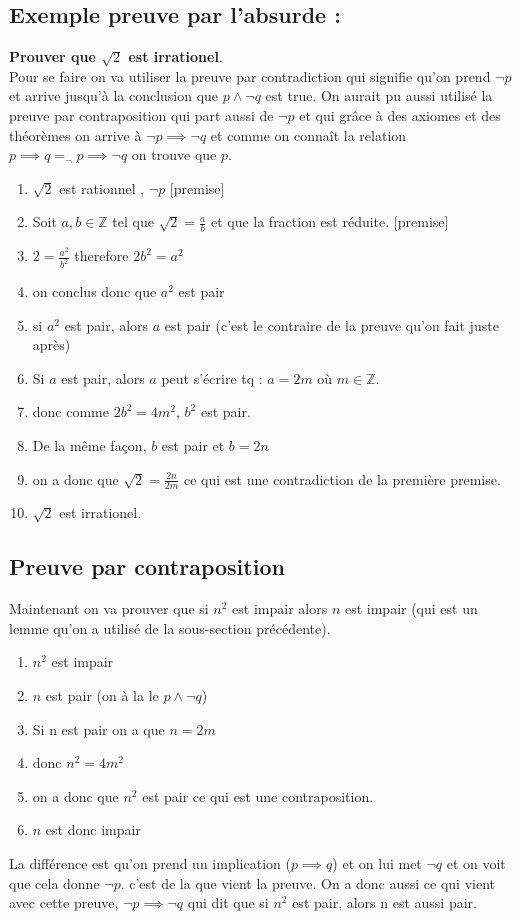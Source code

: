 \subsection{Exemple preuve par l'absurde :}

\textbf{Prouver que $\sqrt{2}$ est irrationel}.
\\
Pour se faire on va utiliser la preuve par contradiction qui signifie qu'on prend $\neg p$ et arrive jusqu'à la conclusion que $p \wedge \neg q$ est true. On aurait pu aussi utilisé la preuve par contraposition qui part aussi de $\neg p$ et qui grâce à des axiomes et des théorèmes on arrive à $\neg p \implies \neg q$ et comme on connaît la relation $p \implies q =_ \neg p \implies \neg q$ on trouve que $p$.
\\
\begin{enumerate}
    \item $\sqrt{2}$ est rationnel , $\neg p$ [premise]
    \item Soit $a, b \in \mathbb{Z}$ tel que $\sqrt{2} = \frac{a}{b}$ et que la fraction est réduite. [premise]
    \item $2 = \frac{a^2}{b^2}$ therefore $2b^2 = a^2$
    \item on conclus donc que $a^2$ est pair
    \item si $a^2$ est pair, alors $a$ est pair (c'est le contraire de la preuve qu'on fait juste après)
    \item Si $a$ est pair, alors $a$ peut s'écrire tq : $a = 2m$ où $m \in \mathbb{Z}$.
    \item donc comme $2b^2 = 4m^2$, $b^2$ est pair.
    \item De la même façon, $b$ est pair et $b = 2n$
    \item on a donc que $\sqrt{2} = \frac{2n}{2m}$ ce qui est une contradiction de la première premise.
    \item $\sqrt{2}$ est irrationel.

\end{enumerate}

\subsection{Preuve par contraposition}
Maintenant on va prouver que si $n^2$ est impair alors $n$ est impair (qui est un lemme qu'on a utilisé de la sous-section précédente).
\begin{enumerate}
    \item $n^2$ est impair
    \item $n$ est pair (on à la le $p \wedge \neg q$)
    \item Si n est pair on a que $n = 2m$
    \item donc $n^2 = 4m^2$
    \item on a donc que $n^2$ est pair ce qui est une contraposition.
    \item $n$ est donc impair
\end{enumerate}
La différence est qu'on prend un implication ($p \implies q$) et on lui met $\neg q$ et on voit que cela donne $\neg p$. c'est de la que vient la preuve. On a donc aussi ce qui vient avec cette preuve, $\neg p \implies \neg q$ qui dit que si $n^2$ est pair, alors n est aussi pair.

